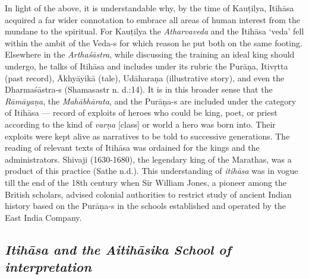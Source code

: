 In light of the above, it is understandable why, by the time of Kauṭilya, Itihāsa acquired a far wider connotation to embrace all areas of human interest from the mundane to the spiritual. For Kauṭilya the \textit{Atharvaveda} and the Itihāsa ‘veda’ fell within the ambit of the \hbox{Veda-s} for which reason he put both on the same footing. Elsewhere in the \textit{Arthaśāstra}, while discussing the training an ideal king should undergo, he talks of Itihāsa and includes under its rubric the Purāṇa, Itivṛtta (past record), Ākhyāyikā (tale), Udāharaṇa (illustrative story), and even the Dharmaśāstra-s (Shamasastr n. d.:14). It is in this broader sense that the \textit{Rāmāyaṇa}, the \textit{Mahābhārata}, and the Purāṇa-s are included under the category of Itihāsa — record of exploits of heroes who could be king, poet, or priest according to the kind of \textit{varṇa} [class] or world a hero was born into. Their exploits were kept alive as narratives to be told to successive generations. The reading of relevant texts of Itihāsa was ordained for the kings and the administrators. Shivaji (1630-1680), the legendary king of the Marathas, was a product of this practice (Sathe n.d.). This understanding of \textit{itihāsa} was in vogue till the end of the 18th century when Sir William Jones, a pioneer among the British scholars, advised colonial authorities to restrict study of ancient Indian history based on the Purāṇa-s in the schools established and operated by the East India Company.

\subsection*{\textit{Itihāsa and the Aitihāsika School of interpretation}}

